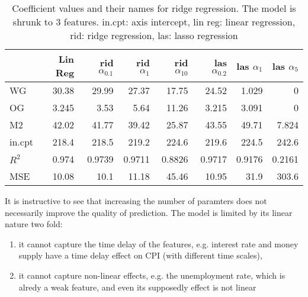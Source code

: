 \documentclass{article}
\begin{document}
\begin{table}
      \caption{Coefficient values and their names for ridge regression.
            The model is shrunk to 3 features.
            in.cpt: axis intercept, lin reg: linear regression, rid: ridge regression, las: lasso regression}
      \label{tab:ridge_coefficients_small}
      \begin{tabular}{lrrrrrrr}
            \toprule
                   & Lin Reg & rid $\alpha_{0.1}$ & rid $\alpha_{1}$ & rid $\alpha_{10}$ & las $\alpha_{0.2}$ & las $\alpha_{1}$ & las $\alpha_{5}$ \\
            \midrule
            WG     & 30.38   & 29.99              & 27.37            & 17.75             & 24.52              & 1.029            & 0                \\
            OG     & 3.245   & 3.53               & 5.64             & 11.26             & 3.215              & 3.091            & 0                \\
            M2     & 42.02   & 41.77              & 39.42            & 25.87             & 43.55              & 49.71            & 7.824            \\
            in.cpt & 218.4   & 218.5              & 219.2            & 224.6             & 219.6              & 224.5            & 242.6            \\
            $R^2$  & 0.974   & 0.9739             & 0.9711           & 0.8826            & 0.9717             & 0.9176           & 0.2161           \\
            MSE    & 10.08   & 10.1               & 11.18            & 45.46             & 10.95              & 31.9             & 303.6            \\
            \bottomrule
      \end{tabular}
\end{table}


It is instructive to see that increasing the number of paramters
does not necessarily improve the quality of prediction.
The model is limited by its linear nature two fold:
\begin{enumerate}
      \item it cannot capture the time delay of the features,
            e.g. interest rate and money supply have a time delay effect on CPI (with different time scales),
      \item it cannot capture non-linear effects, e.g. the unemployment rate,
            which is alredy a weak feature, and even its supposedly effect is not linear
\end{enumerate}
\end{document}
